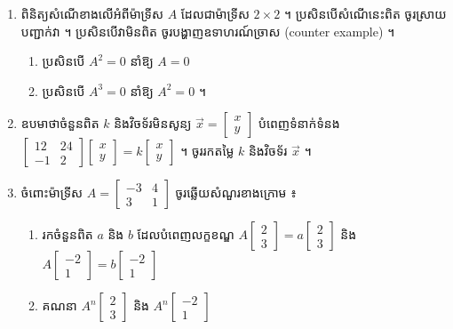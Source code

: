 \begin{enumerate}[1]
  \item ពិនិត្យសំណើខាងលើអំពីម៉ាទ្រីស $A$ ដែលជាម៉ាទ្រីស $2\times 2$ ។ ប្រសិនបើសំណើនេះពិត ចូរស្រាយបញ្ជាក់វា ។ ប្រសិនបើវាមិនពិត ចូរបង្ហាញឧទាហរណ៍ច្រាស (counter example) ។
  \begin{enumerate}[a]
    \item ប្រសិនបើ $A^2 = 0$ នាំឱ្យ $A = 0$
    \item ប្រសិនបើ $A^3 = 0$ នាំឱ្យ $A^2 = 0$ ។
  \end{enumerate}
  \item ឧបមាថាចំនួនពិត $k$ និងវិចទ័រមិនសូន្យ $\overrightarrow{x} = \begin{bmatrix} x\\ y \end{bmatrix}$ បំពេញទំនាក់ទំនង $\begin{bmatrix} 12 & 24\\ -1 & 2 \end{bmatrix}\begin{bmatrix} x\\ y \end{bmatrix} = k\begin{bmatrix} x\\ y \end{bmatrix}$ ។ ចូររកតម្លៃ $k$ និងវិចទ័រ $\overrightarrow{x}$ ។
  \item ចំពោះម៉ាទ្រីស $A = \begin{bmatrix} -3 & 4\\ 3 & 1 \end{bmatrix}$ ចូរឆ្លើយសំណួរខាងក្រោម ៖
  \begin{enumerate}[a]
    \item រកចំនួនពិត $a$ និង $b$ ដែលបំពេញលក្ខខណ្ឌ $A\begin{bmatrix} 2\\ 3 \end{bmatrix} = a\begin{bmatrix} 2\\ 3 \end{bmatrix}$ និង $A\begin{bmatrix} -2\\ 1 \end{bmatrix} = b\begin{bmatrix} -2\\ 1 \end{bmatrix}$
    \item គណនា $A^n\begin{bmatrix} 2\\ 3 \end{bmatrix}$ និង $A^n\begin{bmatrix} -2\\ 1 \end{bmatrix}$

\end{enumerate}
\end{enumerate}
